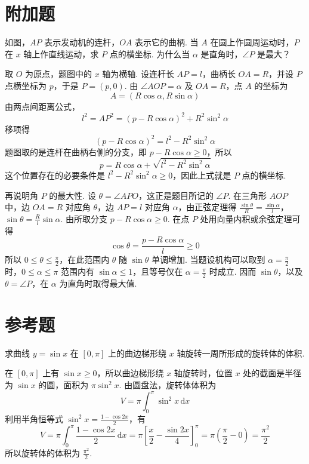 \section{附加题}

\begin{problem}
如图，\(AP\) 表示发动机的连杆，\(OA\) 表示它的曲柄. 当 \(A\) 在圆上作圆周运动时，\(P\) 在 \(x\) 轴上作直线运动，求 \(P\) 点的横坐标. 为什么当 \(\alpha\) 是直角时，\(\angle P\) 是最大？

\end{problem}

\begin{solution}
取 \(O\) 为原点，题图中的 \(x\) 轴为横轴. 设连杆长 \(AP=l\)，曲柄长 \(OA=R\)，并设 \(P\) 点横坐标为 \(p\)，于是 \(P=\left(p,0\right)\). 由 \(\angle AOP=\alpha\) 及 \(OA=R\)，点 \(A\) 的坐标为
\[
A=\left(R\cos\alpha,R\sin\alpha\right)
\]
由两点间距离公式，
\[
l^2=AP^2=\left(p-R\cos\alpha\right)^2+R^2\sin^2\alpha
\]
移项得
\[
\left(p-R\cos\alpha\right)^2=l^2-R^2\sin^2\alpha
\]
题图取的是连杆在曲柄右侧的分支，即 \(p-R\cos\alpha\geqslant0\)，所以
\[
p=R\cos\alpha+\sqrt{l^2-R^2\sin^2\alpha}
\]
这个位置存在的必要条件是 \(l^2-R^2\sin^2\alpha\geqslant0\)，因此上式就是 \(P\) 点的横坐标.

再说明角 \(P\) 的最大性. 设 \(\theta=\angle APO\)，这正是题目所记的 \(\angle P\). 在三角形 \(AOP\) 中，边 \(OA=R\) 对应角 \(\theta\)，边 \(AP=l\) 对应角 \(\alpha\)，由正弦定理得
\(\frac{\sin\theta}{R}=\frac{\sin\alpha}{l}\)，\(\sin\theta=\frac{R}{l}\sin\alpha\).
由所取分支 \(p-R\cos\alpha\geqslant0\). 在点 \(P\) 处用向量内积或余弦定理可得
\[
\cos\theta=\frac{p-R\cos\alpha}{l}\geqslant0
\]
所以 \(0\leqslant\theta\leqslant\frac\pi2\)，在此范围内 \(\theta\) 随 \(\sin\theta\) 单调增加. 当题设机构可以取到 \(\alpha=\frac\pi2\) 时，\(0\leqslant\alpha\leqslant\pi\) 范围内有 \(\sin\alpha\leqslant1\)，且等号仅在 \(\alpha=\frac\pi2\) 时成立. 因而 \(\sin\theta\)，以及 \(\theta=\angle P\)，在 \(\alpha\) 为直角时取得最大值.
\end{solution}

\section{参考题}

\begin{problem}
求曲线 \(y=\sin x\) 在 \(\left[0,\pi\right]\) 上的曲边梯形绕 \(x\) 轴旋转一周所形成的旋转体的体积.
\end{problem}

\begin{solution}
在 \(\left[0,\pi\right]\) 上有 \(\sin x\geqslant0\)，所以曲边梯形绕 \(x\) 轴旋转时，位置 \(x\) 处的截面是半径为 \(\sin x\) 的圆，面积为 \(\pi\sin^2x\). 由圆盘法，旋转体体积为
\[
V=\pi\int_0^\pi\sin^2x\,\mathrm{d}x
\]
利用半角恒等式 \(\sin^2x=\frac{1-\cos2x}{2}\)，有
\[
V=\pi\int_0^\pi\frac{1-\cos2x}{2}\,\mathrm{d}x
 =\pi\left[\frac{x}{2}-\frac{\sin2x}{4}\right]_{0}^{\pi}
 =\pi\left(\frac\pi2-0\right)=\frac{\pi^2}{2}
\]
所以旋转体的体积为 \(\frac{\pi^2}{2}\).
\end{solution}
